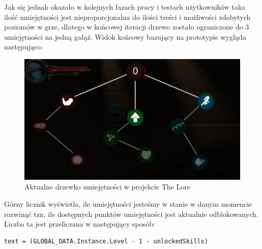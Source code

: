 \documentclass[oneside,polski,logo]{amuthesis}
\begin{document}
Jak się jednak okazało w kolejnych fazach pracy i testach użytkowników taka ilość umiejętności jest nieproporcjonalna do ilości treści i możliwości zdobytych poziomów w grze, dlatego w końcowej iteracji drzewo zostało ograniczone do 3 umiejętności na jedną gałąź. Widok końcowy bazujący na prototypie wygląda następująco:

\begin{figure}[h]
	\centering
	\includegraphics[width=13cm]{images/kozubal/drzewkoTheLore.jpg}
	\caption{Aktualne drzewko umiejętności w projekcie The Lore}
\end{figure}
\newpage
Górny licznik wyświetla, ile umiejętności jesteśmy w stanie w danym momencie rozwinąć tzn. ile dostępnych punktów umiejętności jest aktualnie odblokowanych. Liczba ta jest przeliczana w następujący sposób:

\begin{lstlisting}[breaklines=true,
language={[Sharp]C},
rulecolor=\color{blue!80!black},
caption={Fragment klasy \texttt{UI\_SkillTree.cs}}
]    
text = (GLOBAL_DATA.Instance.Level - 1 - unlockedSkills)
\end{lstlisting}
\end{document}
